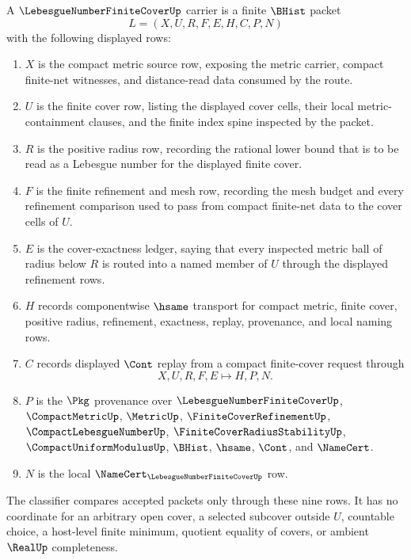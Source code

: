 \begin{definition}
\label{def:lebesgue-number-finite-cover-carrier}
A $\LebesgueNumberFiniteCoverUp$ carrier is a finite $\BHist$ packet
$$
L=(X,U,R,F,E,H,C,P,N)
$$
with the following displayed rows:
\begin{enumerate}
\item $X$ is the compact metric source row, exposing the metric carrier, compact finite-net witnesses, and distance-read data consumed by the route.
\item $U$ is the finite cover row, listing the displayed cover cells, their local metric-containment clauses, and the finite index spine inspected by the packet.
\item $R$ is the positive radius row, recording the rational lower bound that is to be read as a Lebesgue number for the displayed finite cover.
\item $F$ is the finite refinement and mesh row, recording the mesh budget and every refinement comparison used to pass from compact finite-net data to the cover cells of $U$.
\item $E$ is the cover-exactness ledger, saying that every inspected metric ball of radius below $R$ is routed into a named member of $U$ through the displayed refinement rows.
\item $H$ records componentwise $\hsame$ transport for compact metric, finite cover, positive radius, refinement, exactness, replay, provenance, and local naming rows.
\item $C$ records displayed $\Cont$ replay from a compact finite-cover request through
$$
X,U,R,F,E \longmapsto H,P,N .
$$
\item $P$ is the $\Pkg$ provenance over $\LebesgueNumberFiniteCoverUp$, $\CompactMetricUp$, $\MetricUp$, $\FiniteCoverRefinementUp$, $\CompactLebesgueNumberUp$, $\FiniteCoverRadiusStabilityUp$, $\CompactUniformModulusUp$, $\BHist$, $\hsame$, $\Cont$, and $\NameCert$.
\item $N$ is the local $\NameCert_{\LebesgueNumberFiniteCoverUp}$ row.
\end{enumerate}
The classifier compares accepted packets only through these nine rows. It has no coordinate for an arbitrary open cover, a selected subcover outside $U$, countable choice, a host-level finite minimum, quotient equality of covers, or ambient $\RealUp$ completeness.
\end{definition}

